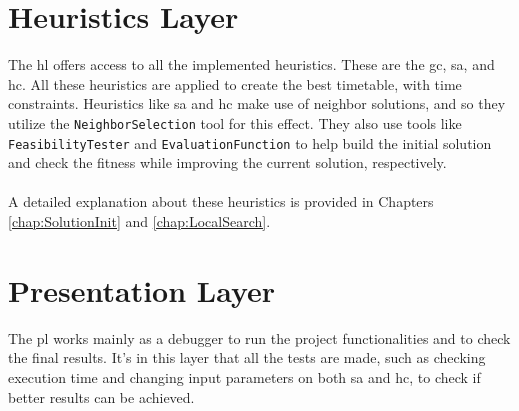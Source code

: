 \section{Heuristics Layer}

The \gls{hl} offers access to all the implemented heuristics. These are the \gls{gc}, \gls{sa}, and \gls{hc}. All these heuristics are applied to create the best timetable, with time constraints. Heuristics like \gls{sa} and \gls{hc} make use of neighbor solutions, and so they utilize the \verb+NeighborSelection+ tool for this effect. They also use tools like \verb+FeasibilityTester+ and \verb+EvaluationFunction+ to help build the initial solution and check the fitness while improving the current solution, respectively.\\
\\
A detailed explanation about these heuristics is provided in Chapters \ref{chap:SolutionInit} and \ref{chap:LocalSearch}.

\section{Presentation Layer}

The \gls{pl} works mainly as a debugger to run the project functionalities and to check the final results. It's in this layer that all the tests are made, such as checking execution time and changing input parameters on both \gls{sa} and \gls{hc}, to check if better results can be achieved.










